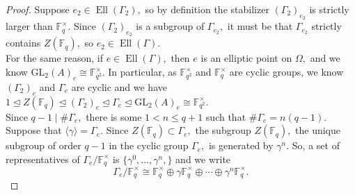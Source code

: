 \documentclass[11pt]{amsart}
\theoremstyle{definition}
\numberwithin{equation}{section}
\newcommand{\GL}{\mathrm{GL}} 	%
\newcommand{\bbF}{\mathbb{F}}		%
\begin{document}
		\begin{proof}
			Suppose $e_2\in \operatorname{Ell}(\Gamma_2),$ so by definition the stabilizer $(\Gamma_2)_{e_2}$ is strictly larger than $\bbF_q^{\times}.$ Since $(\Gamma_2)_{e_2}$ is a subgroup of $\Gamma_{e_2},$ it must be that $\Gamma_{e_2}$ strictly contains $Z(\bbF_q),$ so $e_2\in \operatorname{Ell}(\Gamma).$\\
			
			For the same reason, if $e\in \operatorname{Ell}(\Gamma),$ then $e$ is an elliptic point on $\Omega,$ and we know $\GL_2(A)_e\cong \bbF_{q^2}^{\times}.$  In particular, as $\bbF_{q^2}^{\times}$ and $\bbF_q^{\times}$ are cyclic groups, we know $(\Gamma_2)_e$ and $\Gamma_e$ are cyclic and we have $1\unlhd Z(\bbF_q)\unlhd (\Gamma_2)_e\unlhd \Gamma_e\unlhd \GL_2(A)_e\cong \bbF_{q^2}^{\times}.$\\
			
			Since $q-1\mid \#\Gamma_e,$ there is some $1<n\leq q+1$ such that $\#\Gamma_e=n(q-1).$ 
			Suppose that $\langle \gamma \rangle =\Gamma_e.$ Since $Z(\bbF_q)\subset \Gamma_e,$ the subgroup $Z(\bbF_q),$ the unique subgroup of order $q-1$ in the cyclic group $\Gamma_e,$ is generated by $\gamma^n.$ So, a set of representatives of $\Gamma_e/\bbF_q^{\times}$ is $\{\gamma^0,\ldots, \gamma^n,\}$ and we write 
			\[\Gamma_e/\bbF_q^{\times}\cong \bbF_q^{\times}\oplus \gamma\bbF_q^{\times}\oplus\cdots\oplus\gamma^n\bbF_q^{\times}.\]
			
			

\end{proof}
\end{document}
